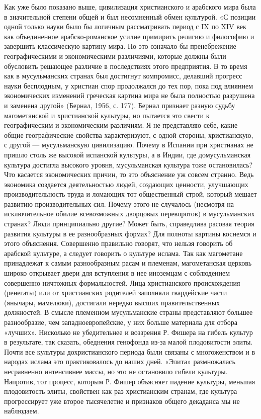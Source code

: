 Как уже было показано выше, цивилизация христианского и арабского мира
была в значительной  степени общей и был  несомненный обмен культурой.
«С позиции одной только науки  было бы логичным рассматривать период с
IX  по XIV  век  как объединенное  арабско-романское усилие  примирить
религию  и философию  и завершить  классическую картину  мира. Но  это
означало бы пренебрежение географическими и экономическими различиями,
которые должны были обусловить  решающее различие в последствиях этого
предприятия.  В то  время как  в мусульманских  странах был  достигнут
компромисс,  делавший  прогресс  науки  бесплодным,  у  христиан  спор
продолжался  до тех  пор,  пока под  влиянием экономических  изменений
греческая  картина  мира  не   была  полностью  разрушена  и  заменена
другой»  (Бернал,  1956,  с.   177).  Бернал  признает  разную  судьбу
магометанской  и  христианской  культуры,  но пытается  это  свести  к
географическим  и  экономическим  различиям. Я  не  представляю  себе,
какие общие  географические свойства  характеризуют, с  одной стороны,
христианскую, с другой --- мусульманскую цивилизацию. Почему в Испании
при  христианах  не пришло  столь  же  высокой испанской  культуры,  а
в  Индии,  где  домусульманская  культура  достигла  высокого  уровня,
мусульманская культура  тоже остановилась? Что  касается экономических
причин,  то   это  объяснение   уж  совсем  странно.   Ведь  экономика
создается   деятельностью   людей,  создающих   ценности,   улучшающих
производительность труда  и ломающих  тот общественный  строй, который
мешает  развитию  производительных  сил.  Почему  этого  не  случалось
(несмотря на исключительное обилие всевозможных дворцовых переворотов)
в  мусульманских  странах?  Люди  принципиально  другие?  Может  быть,
справедлива  расовая  теория  развития  культуры  в  ее  разнообразных
формах? Для  полноты картины  коснемся и этого  объяснения. Совершенно
правильно  говорят,  что  нельзя  говорить  об  арабской  культуре,  а
следует говорить о  культуре ислама. Так как  магометане принадлежат к
самым  разнообразным расам  и племенам,  магометанская церковь  широко
открывает  двери   для  вступления  в  нее   иноземцам  с  соблюдением
совершенно ничтожных  формальностей. Лица  христианского происхождения
(ренегаты) или  от христианских родителей заполняли  гвардейские части
(янычары,  мамелюки),   достигали  нередко   высших  правительственных
должностей.  В  смысле  племенном  мусульманские  страны  представляют
большее разнообразие,  чем западноевропейские, у них  больше материала
для отбора «лучших».  Нисколько не убедительнее и  воззрения Р. Фишера
на гибель культур в результате, так сказать, обеднения генофонда из-за
малой плодовитости  элиты. Почти все культуры  дохристианского периода
были связаны с многоженством и  в народах ислама это практиковалось до
наших дней. «Элита» размножалась несравненно интенсивнее массы, но это
не остановило гибели культуры. Напротив, тот процесс, которым Р. Фишер
объясняет падение культуры, меньшая  плодовитость элиты, свойствен как
раз  христианским  странам,  где  культура  прогрессирует  уже  второе
тысячелетие и признаков общего декаданса мы не наблюдаем.

